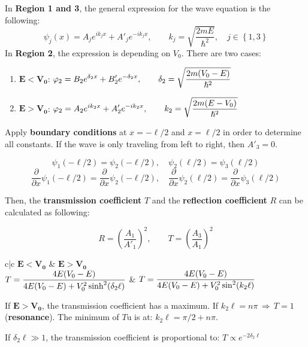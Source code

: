 \documentclass[a4paper, 9pt]{extarticle}
\begin{document}
\begin{twocolumn}
In \textbf{Region 1 and 3}, the general expression for the wave equation is the following:
$$\psi_j(x) = A_j e^{i k_j x} + A'_j e^{-i k_j x}, \qquad k_j = \sqrt{\frac{2mE}{\hslash^2}}, \quad j \in \left\{ 1, 3 \right\}$$
In \textbf{Region 2}, the expression is depending on $V_0$. There are two cases:
\begin{enumerate}
	\item $\mathbf{E < V_0}$: $\displaystyle \varphi_2 = B_2 e^{\delta_2 x} + B'_2 e^{- \delta_2 x}, \qquad \delta_2 = \sqrt{\frac{2m(V_0 - E)}{\hslash^2}}$
	\item $\mathbf{E > V_0}$: $\displaystyle \varphi_2 = A_2 e^{i k_2 x} + A'_2 e^{-i k_2 x}, \qquad k_2 = \sqrt{\frac{2m(E - V_0)}{\hslash^2}}$
\end{enumerate}
Apply \textbf{boundary conditions} at $x = -\ell/2$ and $x = \ell/2$ in order to determine all constants. If the wave is only traveling from left to right, then $A'_3 = 0$.

$$\psi_1(-\ell/2) = \psi_2(-\ell/2), \quad \psi_2(\ell/2) = \psi_3(\ell/2)$$
$$\frac{\partial}{\partial x}\psi_1(-\ell/2) = \frac{\partial}{\partial x}\psi_2(-\ell/2), \quad \frac{\partial}{\partial x}\psi_2(\ell/2) = \frac{\partial}{\partial x}\psi_3(\ell/2)$$

Then, the \textbf{transmission coefficient} $T$ and the \textbf{reflection coefficient} $R$ can be calculated as following:

$$R = \left(\frac{A_1}{A'_1}\right)^2, \qquad T = \left(\frac{A_3}{A_1}\right)^2$$

\begin{center}
\begin{mtabular}{c|c}
	$\mathbf{E < V_0}$ & $\mathbf{E > V_0}$ \\
	$\displaystyle T = \frac{4E (V_0 - E)}{4 E (V_0 - E) + V_0^2 \sinh^2 ( \delta_2 \ell )}$ &
	$\displaystyle T = \frac{4E (V_0 - E)}{4 E (V_0 - E) + V_0^2 \sin^2 ( k_2 \ell )}$ \\
\end{mtabular}
\end{center}

If $\mathbf{E > V_0}$, the transmission coefficient has a maximum. If $k_2 \ell = n \pi \, \Rightarrow \, T = 1$ (\textbf{resonance}). The minimum of $T$u is at: $k_2 \ell = \pi/2 + n\pi$.

If $\delta_2 \ell \gg 1$, the transmission coefficient is proportional to: $T \propto e^{-2 \delta_2 \ell}$

\end{twocolumn}
\end{document}
